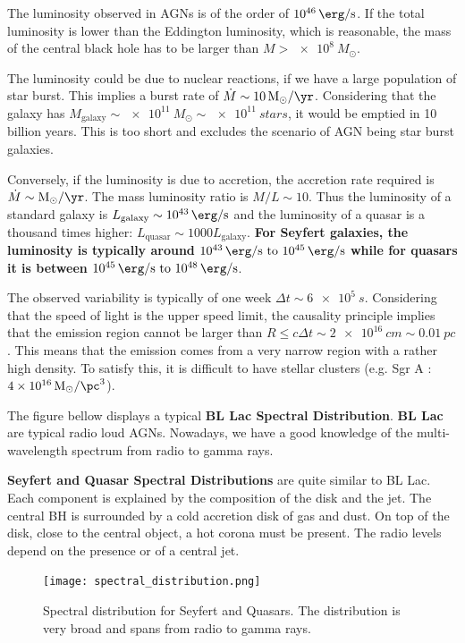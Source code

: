 \documentclass[10pt,a4paper,english]{article}
\begin{document}
The luminosity observed in AGNs is of the order of $\SI{e46}{\erg\per\s}$. If
the total luminosity is lower than the Eddington luminosity, which is
reasonable, the mass of the central black hole has to be larger than $M >
\SI{e8}{M_\odot}$.

The luminosity could be due to nuclear reactions, if we have a large population
of star burst. This implies a burst rate of $\dot{M} \sim
\SI{10}{M_\odot\per\yr}$. Considering that the galaxy has $M_\mathrm{galaxy}
\sim \SI{e11}{M_\odot} \sim \SI{e11}{stars}$, it would be emptied in 10 billion
years. This is too short and excludes the scenario of AGN being star burst
galaxies.

Conversely, if the luminosity is due to accretion, the accretion rate required
is $\dot{M} \sim \si{M_\odot\per\yr}$. The mass luminosity ratio is $M/L \sim
10$. Thus the luminosity of a standard galaxy is $L_\mathrm{galaxy} \sim
\SI{e43}{\erg\per\s}$ and the luminosity of a quasar is a thousand times
higher: $L_\mathrm{quasar}\sim 1000 L_\mathrm{galaxy}$. \textbf{For Seyfert
galaxies, the luminosity is typically around $\SIrange{e43}{e45}{\erg\per\s}$
while for quasars it is between $\SIrange{e45}{e48}{\erg\per\s}$}.

The observed variability is typically of one week $\Delta t \sim \SI{6e5}{s}$.
Considering that the speed of light is the upper speed limit, the causality
principle implies that the emission region cannot be larger than $R \leq
c\Delta t \sim \SI{2e16}{cm} \sim \SI{0.01}{pc}$. This means that the emission
comes from a very narrow region with a rather high density. To satisfy this, it
is difficult to have stellar clusters (e.g. Sgr A :
$\SI{4e16}{M_\odot\per\pc^3}$).

The figure bellow  displays a typical \textbf{BL Lac
Spectral Distribution}. \textbf{BL Lac} are typical radio loud AGNs. Nowadays,
we have a good knowledge of the multi-wavelength spectrum from radio to gamma
rays.


\textbf{Seyfert and Quasar Spectral Distributions} are quite similar to BL Lac.
Each component is explained by the composition of the disk and the jet. The
central BH is surrounded by a cold accretion disk of gas and dust. On top of
the disk, close to the central object, a hot corona must be present. The radio
levels depend on the presence or of a central jet.

\begin{figure}[!ht]
  \centering
  \texttt{[image: spectral\_distribution.png]}
  \caption{\label{fig:spectral_distribution} Spectral distribution for Seyfert and Quasars. The distribution is very broad and spans from radio to gamma rays.}
\end{figure}
\end{document}
